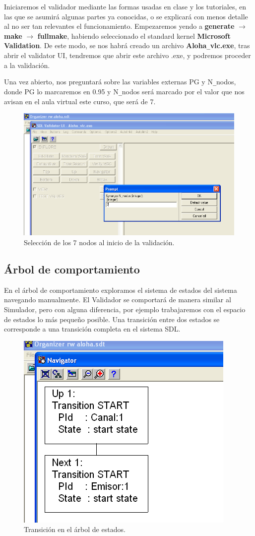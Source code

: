 \documentclass{article}
\begin{document}
Iniciaremos el validador mediante las formas usadas en clase y los tutoriales, en las que se asumirá algunas partes ya conocidas, o se explicará con menos detalle al no ser tan relevantes el funcionamiento. Empezaremos yendo a \textbf{generate} $\rightarrow$ \textbf{make} $\rightarrow$ \textbf{fullmake}, habiendo seleccionado el standard kernel \textbf{Microsoft Validation}. De este modo, se nos habrá creado un archivo \textbf{Aloha}\verb|_|\textbf{vlc.exe}, tras abrir el validator UI, tendremos que abrir este archivo .exe, y podremos proceder a la validación.

\quad

Una vez abierto, nos preguntará sobre las variables externas PG y N\verb|_|nodos, donde PG lo marcaremos en 0.95 y N\verb|_|nodos será marcado por el valor que nos avisan en el aula virtual este curso, que será de 7.

\begin{figure}[h]
    \centering
    \includegraphics[width=0.80\linewidth]{src/variable 7nodos.png}
    \caption{\label{fig:simulador7nodos} Selección de los 7 nodos al inicio de la validación.}
\end{figure}

\subsection{Árbol de comportamiento}

En el árbol de comportamiento exploramos el sistema de estados del sistema navegando manualmente. El Validador se comportará de manera similar al Simulador, pero con alguna diferencia, por ejemplo trabajaremos con el espacio de estados lo más pequeño posible. Una transición entre dos estados se corresponde a una transición completa en el sistema SDL. 

\begin{figure}[h]
    \centering
    \includegraphics[width=0.35\linewidth]{src/arbol estados.png}
    \caption{\label{fig:arbolestados} Transición en el árbol de estados.}
\end{figure}
\end{document}
